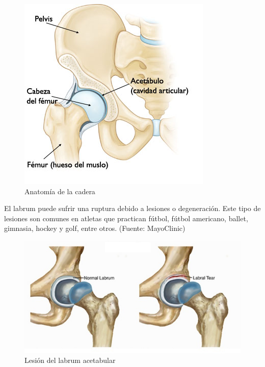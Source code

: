 \documentclass[11pt]{book}
\newcommand{\forceindent}{\leavevmode{\parindent=2em\indent}} %
\begin{document}
	     	\begin{figure}[h]
	     		\begin{center}
	     			\centering
	     			\includegraphics[scale=1.5]{cadera}
	     			\caption{Anatomía de la cadera}
	     			\label{fig:cadera}
	     		\end{center}
	     	\end{figure}
	        
	        \forceindent El labrum puede sufrir una ruptura debido a lesiones o degeneración.  Este tipo de lesiones son comunes en atletas que practican fútbol, fútbol americano, ballet, gimnasia, hockey y golf, entre otros. (Fuente: MayoClinic)
	        
	        \begin{figure}[h]
	        	  \begin{center}
	        	     \centering
	        	     \includegraphics[scale=.6]{tear}
	        	     \caption{Lesión del labrum acetabular}
	        	     \label{fig:tear}
	        	  \end{center}
	        \end{figure}
	       
\end{document}
